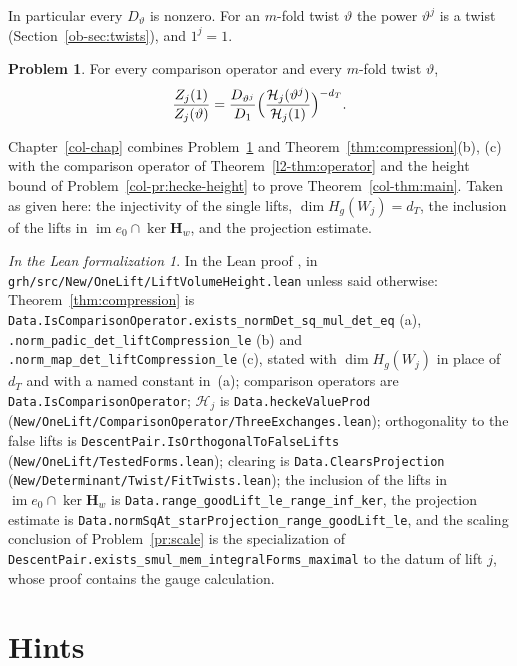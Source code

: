 \documentclass[reqno]{amsart}
\newcounter{chap}
\theoremstyle{definition}
\newtheorem{problem}{Problem}[section]
\theoremstyle{plain}
\theoremstyle{remark}
\newtheorem*{leanremark}{In the Lean formalization}
\newcommand{\Hc}{{\mathcal{H}}}
\newcommand{\Hb}{{\mathbf{H}}}
\newcommand{\im}{\operatorname{im}}
\newcommand{\tl}[1]{\texttt{#1}}
\begin{document}
In particular every \(D_\vartheta\) is nonzero.  For an \(m\)-fold twist \(\vartheta\) the power \(\vartheta^j\) is a twist (Section~\ref{ob-sec:twists}), and \(1^j = 1\).

\begin{problem}\label{pr:quotient}
For every comparison operator and every \(m\)-fold twist \(\vartheta\),
\[
  \frac{Z_j(1)}{Z_j(\vartheta)} = \frac{D_{\vartheta^j}}{D_1}\Bigl(\frac{\Hc_j(\vartheta^j)}{\Hc_j(1)}\Bigr)^{-d_T} .
\]
\end{problem}

Chapter~\ref{col-chap} combines Problem~\ref{pr:quotient} and Theorem~\ref{thm:compression}(b), (c) with the comparison operator of Theorem~\ref{l2-thm:operator} and the height bound of Problem~\ref{col-pr:hecke-height} to prove Theorem~\ref{col-thm:main}.  Taken as given here: the injectivity of the single lifts, \(\dim H_g(W_j) = d_T\), the inclusion of the lifts in \(\im e_0 \cap \ker\Hb_w\), and the projection estimate.

\begin{leanremark}
\raggedright In the Lean proof \cite{GL}, in \tl{grh/src/New/OneLift/LiftVolumeHeight.lean} unless said otherwise: Theorem~\ref{thm:compression} is \tl{Data.IsComparisonOperator.exists\_normDet\_sq\_mul\_det\_eq} (a), \tl{.norm\_padic\_det\_liftCompression\_le} (b) and \tl{.norm\_map\_det\_liftCompression\_le} (c), stated with \(\dim H_g(W_j)\) in place of \(d_T\) and with a named constant in~(a); comparison operators are \tl{Data.IsComparisonOperator}; \(\Hc_j\) is \tl{Data.heckeValueProd} (\tl{New/OneLift/ComparisonOperator/ThreeExchanges.lean}); orthogonality to the false lifts is \tl{DescentPair.IsOrthogonalToFalseLifts} (\tl{New/OneLift/TestedForms.lean}); clearing is \tl{Data.ClearsProjection} (\tl{New/Determinant/Twist/FitTwists.lean}); the inclusion of the lifts in \(\im e_0 \cap \ker \Hb_w\) is \tl{Data.range\_goodLift\_le\_range\_inf\_ker}, the projection estimate is \tl{Data.normSqAt\_starProjection\_range\_goodLift\_le}, and the scaling conclusion of Problem~\ref{pr:scale} is the specialization of \tl{DescentPair.exists\_smul\_mem\_integralForms\_maximal} to the datum of lift \(j\), whose proof contains the gauge calculation.
\end{leanremark}

\section*{Hints}
\end{document}
